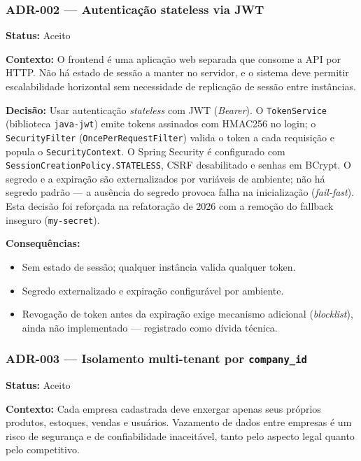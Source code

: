 \documentclass[12pt,a4paper]{article}
\begin{document}
\subsubsection{ADR-002 --- Autenticação stateless via JWT}

\noindent\textbf{Status:} Aceito

\noindent\textbf{Contexto:}
O frontend é uma aplicação web separada que consome a API por HTTP. Não há estado de sessão a manter no servidor, e o sistema deve permitir escalabilidade horizontal sem necessidade de replicação de sessão entre instâncias.

\noindent\textbf{Decisão:}
Usar autenticação \textit{stateless} com JWT (\textit{Bearer}). O \texttt{TokenService} (biblioteca \texttt{java-jwt}) emite tokens assinados com HMAC256 no login; o \texttt{SecurityFilter} (\texttt{OncePerRequestFilter}) valida o token a cada requisição e popula o \texttt{SecurityContext}. O Spring Security é configurado com \texttt{SessionCreationPolicy.STATELESS}, CSRF desabilitado e senhas em BCrypt. O segredo e a expiração são externalizados por variáveis de ambiente; não há segredo padrão — a ausência do segredo provoca falha na inicialização (\textit{fail-fast}). Esta decisão foi reforçada na refatoração de 2026 com a remoção do fallback inseguro (\texttt{my-secret}).

\noindent\textbf{Consequências:}
\begin{itemize}
    \item[+] Sem estado de sessão; qualquer instância valida qualquer token.
    \item[+] Segredo externalizado e expiração configurável por ambiente.
    \item[--] Revogação de token antes da expiração exige mecanismo adicional (\textit{blocklist}), ainda não implementado — registrado como dívida técnica.
\end{itemize}

\subsubsection{ADR-003 --- Isolamento multi-tenant por \texttt{company\_id}}

\noindent\textbf{Status:} Aceito

\noindent\textbf{Contexto:}
Cada empresa cadastrada deve enxergar apenas seus próprios produtos, estoques, vendas e usuários. Vazamento de dados entre empresas é um risco de segurança e de confiabilidade inaceitável, tanto pelo aspecto legal quanto pelo competitivo.
\end{document}
